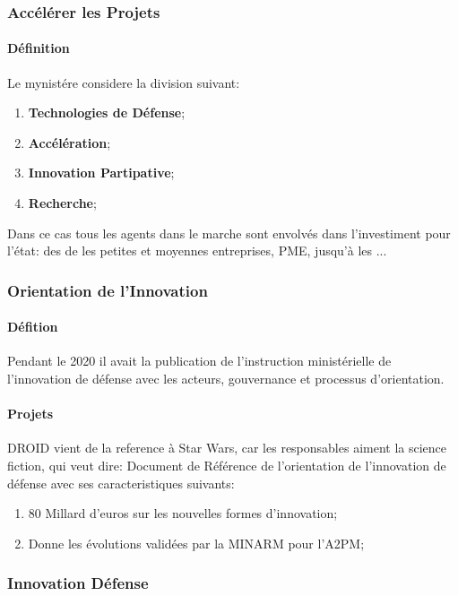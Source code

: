 \documentclass{article}
\begin{document}
\subsubsection{Accélérer les Projets}
\paragraph{Définition}Le mynistére considere la division suivant:
\begin{enumerate}[noitemsep]
    \item \textbf{Technologies de Défense};
    \item \textbf{Accélération};
    \item \textbf{Innovation Partipative};
    \item \textbf{Recherche};
\end{enumerate}
Dans ce cas tous les agents dans le marche sont envolvés dans l'investiment pour l'état: des de les petites et moyennes entreprises, PME, jusqu'à les ...

\subsubsection{Orientation de l'Innovation}
\paragraph{Défition}Pendant le 2020 il avait la publication de l'instruction ministérielle de l'innovation de défense avec les acteurs, gouvernance et processus d'orientation.

\paragraph{Projets}DROID vient de la reference à Star Wars, car les responsables aiment la science fiction, qui veut dire: Document de Référence de l'orientation de l'innovation de défense avec ses caracteristiques suivants:
\begin{enumerate}[noitemsep]
    \item 80 Millard d'euros sur les nouvelles formes d'innovation;
    \item Donne les évolutions validées par la MINARM pour l'A2PM;
\end{enumerate}

\subsubsection{Innovation Défense}
\end{document}
